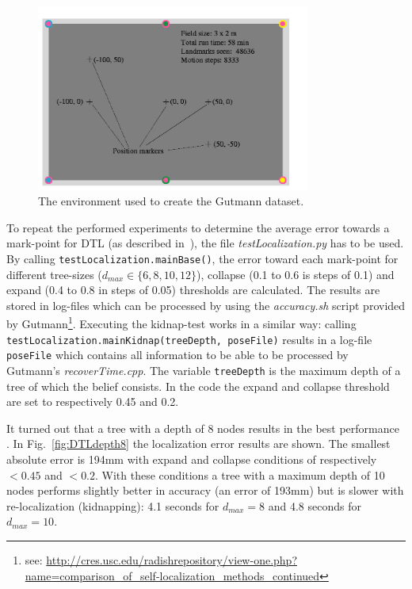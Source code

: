\documentclass[11pt,a4paper,oneside]{article}
\begin{document}
\begin{figure}
\centering
\includegraphics[width=9cm]{fieldsetup.png}
\caption{The environment used to create the Gutmann dataset.}
\label{fig:GutmannEnvironment}
\end{figure}

To repeat the performed experiments to determine the average error towards a mark-point for DTL (as described in~\cite{BscThesisHesselDTL}), the file \textit{testLocalization.py} has to be used. By calling \texttt{testLocalization.mainBase()}, the error toward each mark-point for different tree-sizes ($d_{max} \in \{6, 8, 10, 12\}$), collapse (0.1 to 0.6 is steps of 0.1) and expand (0.4 to 0.8 in steps of 0.05) thresholds are calculated. The results are stored in log-files which can be processed by using the \textit{accuracy.sh} script provided by Gutmann\footnote{see: \url{http://cres.usc.edu/radishrepository/view-one.php?name=comparison_of_self-localization_methods_continued}}. Executing the kidnap-test works in a similar way: calling \texttt{testLocalization.mainKidnap(treeDepth, poseFile)} results in a log-file \texttt{poseFile} which contains all information to be able to be processed by Gutmann's \textit{recoverTime.cpp}. The variable \texttt{treeDepth} is the maximum depth of a tree of which the belief consists. In the code the expand and collapse threshold are set to respectively 0.45 and 0.2.

It turned out that a tree with a depth of 8 nodes results in the best performance \cite{BscThesisHesselDTL}. In Fig.~\ref{fig:DTLdepth8} the localization error results are shown. The smallest absolute error is 194mm with expand and collapse conditions of respectively $<0.45$ and $<0.2$. With these conditions a tree with a maximum depth of 10 nodes performs slightly better in accuracy (an error of 193mm) but is slower with re-localization (kidnapping): 4.1 seconds for $d_{max} = 8$ and 4.8 seconds for $d_{max} = 10$. 
\end{document}
